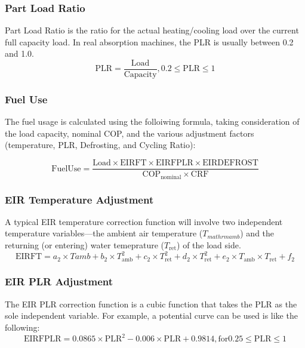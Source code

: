 \subsubsection{Part Load Ratio}
Part Load Ratio is the ratio for the actual heating/cooling load over the current full capacity load. In real absorption machines, the PLR is usually between 0.2 and 1.0. 
\begin{equation}
\mathrm{PLR} = \frac{\mathrm{Load}}{\mathrm{Capacity}}, 0.2 \leq \mathrm{PLR} \leq 1
\end{equation}

\subsubsection{Fuel Use}
The fuel usage is calculated using the folloiwing formula, taking consideration of the load capacity, nominal COP, and the various adjustment factors (temperature, PLR, Defrosting, and Cycling Ratio):

\begin{equation}
\mathrm{Fuel Use} = \frac{\mathrm{Load} \times \mathrm{EIRFT} \times \mathrm{EIRFPLR} \times \mathrm{EIRDEFROST}}{\mathrm{COP}_\mathrm{nominal} \times \mathrm{CRF}}
\end{equation}

\subsubsection{EIR Temperature Adjustment}
A typical EIR temperature correction function will involve two independent temperature variables---the ambient air temperature ($T_{mathrm{amb}}$) and the returning (or entering) water temeprature ($T_{\mathrm{ret}}$) of the load side. 
\begin{equation}
\mathrm{EIRFT} = a_2 \times Tamb + b_2 \times T_{\mathrm{amb}}^{2} + c_2 \times T_{\mathrm{ret}}^{2} + d_2 \times T_{\mathrm{ret}}^{2} + e_2 \times T_{\mathrm{amb}} \times T_{\mathrm{ret}} + f_2
\end{equation}

\subsubsection{EIR PLR Adjustment}
The EIR PLR correction function is a cubic function that takes the PLR as the sole independent variable. For example, a potential curve can be used is like the following:  
\begin{equation}
\mathrm{EIRFPLR} = 0.0865 \times \mathrm{PLR}^{2} - 0.006 \times \mathrm{PLR} + 0.9814, \mathrm{for} 0.25 \leq \mathrm{PLR} \leq 1 
\end{equation}

